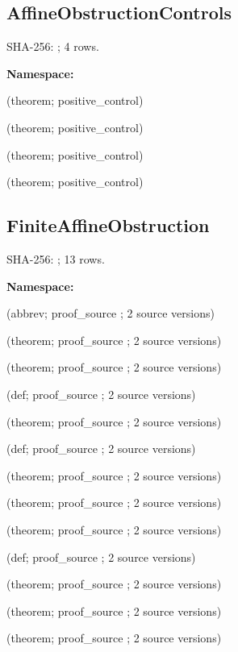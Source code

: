 \subsection*{AffineObstructionControls}
{\footnotesize SHA-256: ; 4 rows.}\par
\begingroup\small
\textbf{Namespace:} \par
\noindent{} {\scriptsize (theorem; positive\_control)}\par
\noindent{} {\scriptsize (theorem; positive\_control)}\par
\noindent{} {\scriptsize (theorem; positive\_control)}\par
\noindent{} {\scriptsize (theorem; positive\_control)}\par
\endgroup
\subsection*{FiniteAffineObstruction}
{\footnotesize SHA-256: ; 13 rows.}\par
\begingroup\small
\textbf{Namespace:} \par
\noindent{} {\scriptsize (abbrev; proof\_source ; 2 source versions)}\par
\noindent{} {\scriptsize (theorem; proof\_source ; 2 source versions)}\par
\noindent{} {\scriptsize (theorem; proof\_source ; 2 source versions)}\par
\noindent{} {\scriptsize (def; proof\_source ; 2 source versions)}\par
\noindent{} {\scriptsize (theorem; proof\_source ; 2 source versions)}\par
\noindent{} {\scriptsize (def; proof\_source ; 2 source versions)}\par
\noindent{} {\scriptsize (theorem; proof\_source ; 2 source versions)}\par
\noindent{} {\scriptsize (theorem; proof\_source ; 2 source versions)}\par
\noindent{} {\scriptsize (theorem; proof\_source ; 2 source versions)}\par
\noindent{} {\scriptsize (def; proof\_source ; 2 source versions)}\par
\noindent{} {\scriptsize (theorem; proof\_source ; 2 source versions)}\par
\noindent{} {\scriptsize (theorem; proof\_source ; 2 source versions)}\par
\noindent{} {\scriptsize (theorem; proof\_source ; 2 source versions)}\par
\endgroup
